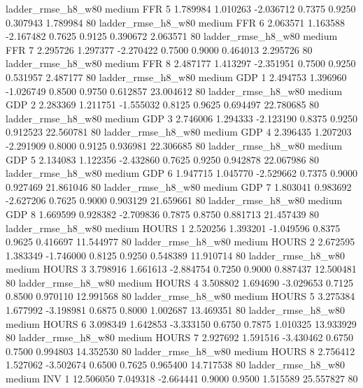    ladder_rmse_h8_w80     medium      FFR                 5  1.789984 1.010263 -2.036712 0.7375 0.9250  0.307943    1.789984 80
    ladder_rmse_h8_w80     medium      FFR                 6  2.063571 1.163588 -2.167482 0.7625 0.9125  0.390672    2.063571 80
    ladder_rmse_h8_w80     medium      FFR                 7  2.295726 1.297377 -2.270422 0.7500 0.9000  0.464013    2.295726 80
    ladder_rmse_h8_w80     medium      FFR                 8  2.487177 1.413297 -2.351951 0.7500 0.9250  0.531957    2.487177 80
    ladder_rmse_h8_w80     medium      GDP                 1  2.494753 1.396960 -1.026749 0.8500 0.9750  0.612857   23.004612 80
    ladder_rmse_h8_w80     medium      GDP                 2  2.283369 1.211751 -1.555032 0.8125 0.9625  0.694497   22.780685 80
    ladder_rmse_h8_w80     medium      GDP                 3  2.746006 1.294333 -2.123190 0.8375 0.9250  0.912523   22.560781 80
    ladder_rmse_h8_w80     medium      GDP                 4  2.396435 1.207203 -2.291909 0.8000 0.9125  0.936981   22.306685 80
    ladder_rmse_h8_w80     medium      GDP                 5  2.134083 1.122356 -2.432860 0.7625 0.9250  0.942878   22.067986 80
    ladder_rmse_h8_w80     medium      GDP                 6  1.947715 1.045770 -2.529662 0.7375 0.9000  0.927469   21.861046 80
    ladder_rmse_h8_w80     medium      GDP                 7  1.803041 0.983692 -2.627206 0.7625 0.9000  0.903129   21.659661 80
    ladder_rmse_h8_w80     medium      GDP                 8  1.669599 0.928382 -2.709836 0.7875 0.8750  0.881713   21.457439 80
    ladder_rmse_h8_w80     medium    HOURS                 1  2.520256 1.393201 -1.049596 0.8375 0.9625  0.416697   11.544977 80
    ladder_rmse_h8_w80     medium    HOURS                 2  2.672595 1.383349 -1.746000 0.8125 0.9250  0.548389   11.910714 80
    ladder_rmse_h8_w80     medium    HOURS                 3  3.798916 1.661613 -2.884754 0.7250 0.9000  0.887437   12.500481 80
    ladder_rmse_h8_w80     medium    HOURS                 4  3.508802 1.694690 -3.029653 0.7125 0.8500  0.970110   12.991568 80
    ladder_rmse_h8_w80     medium    HOURS                 5  3.275384 1.677992 -3.198981 0.6875 0.8000  1.002687   13.469351 80
    ladder_rmse_h8_w80     medium    HOURS                 6  3.098349 1.642853 -3.333150 0.6750 0.7875  1.010325   13.933929 80
    ladder_rmse_h8_w80     medium    HOURS                 7  2.927692 1.591516 -3.430462 0.6750 0.7500  0.994803   14.352530 80
    ladder_rmse_h8_w80     medium    HOURS                 8  2.756412 1.527062 -3.502674 0.6500 0.7625  0.965400   14.717538 80
    ladder_rmse_h8_w80     medium      INV                 1 12.506050 7.049318 -2.664441 0.9000 0.9500  1.515589   25.557827 80
